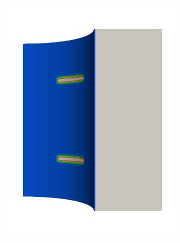 \begin{frame}
\begin{columns}[T]
\begin{column}{0.6\textwidth}
\begin{figure}
{\begin{subfigure}{0.19\textwidth}
            \includegraphics[width=\textwidth]{examples/figures/seed_d_1}
          \end{subfigure}
          \hspace{0.06\textwidth}
          \begin{subfigure}{0.19\textwidth}
            \centering

\end{subfigure}}
\end{figure}
\end{column}
\end{columns}
\end{frame}
